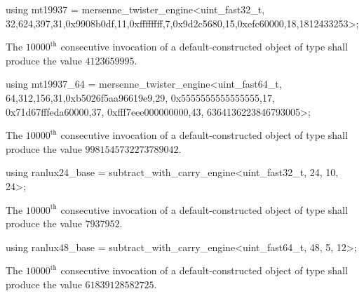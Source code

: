 %
%
\begin{itemdecl}
using mt19937 =
      mersenne_twister_engine<uint_fast32_t,
       32,624,397,31,0x9908b0df,11,0xffffffff,7,0x9d2c5680,15,0xefc60000,18,1812433253>;
\end{itemdecl}

\begin{itemdescr}
\pnum\required
 The $10000^\text{th}$ consecutive invocation
 of a default-constructed object
 of type 
 shall produce the value $4123659995$.
\end{itemdescr}

%
%
\begin{itemdecl}
using mt19937_64 =
      mersenne_twister_engine<uint_fast64_t,
       64,312,156,31,0xb5026f5aa96619e9,29,
       0x5555555555555555,17,
       0x71d67fffeda60000,37,
       0xfff7eee000000000,43,
       6364136223846793005>;
\end{itemdecl}

\begin{itemdescr}
\pnum\required
 The $10000^\text{th}$ consecutive invocation
 of a default-constructed object
 of type 
 shall produce the value $9981545732273789042$.
\end{itemdescr}

%
%
\begin{itemdecl}
using ranlux24_base =
      subtract_with_carry_engine<uint_fast32_t, 24, 10, 24>;
\end{itemdecl}

\begin{itemdescr}
\pnum\required
 The $10000^\text{th}$ consecutive invocation
 of a default-constructed object
 of type 
 shall produce the value
 $7937952$.
\end{itemdescr}

%
%
\begin{itemdecl}
using ranlux48_base =
      subtract_with_carry_engine<uint_fast64_t, 48, 5, 12>;
\end{itemdecl}

\begin{itemdescr}
\pnum\required
 The $10000^\text{th}$ consecutive invocation
 of a default-constructed object
 of type 
 shall produce the value
 $61839128582725$.
\end{itemdescr}

